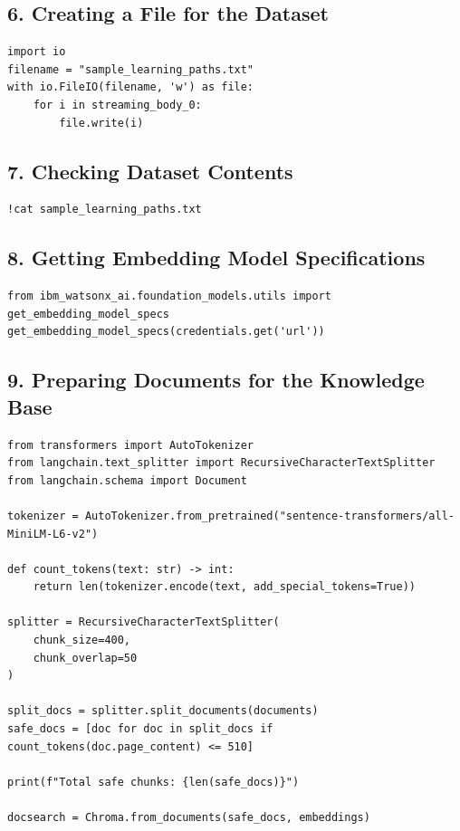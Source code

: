 \documentclass[12pt]{article}
\begin{document}
\subsection*{6. Creating a File for the Dataset}
\begin{lstlisting}
import io
filename = "sample_learning_paths.txt"
with io.FileIO(filename, 'w') as file: 
    for i in streaming_body_0:
        file.write(i)
\end{lstlisting}

\subsection*{7. Checking Dataset Contents}
\begin{lstlisting}
!cat sample_learning_paths.txt
\end{lstlisting}

\subsection*{8. Getting Embedding Model Specifications}
\begin{lstlisting}
from ibm_watsonx_ai.foundation_models.utils import get_embedding_model_specs 
get_embedding_model_specs(credentials.get('url'))
\end{lstlisting}

\subsection*{9. Preparing Documents for the Knowledge Base}
\begin{lstlisting}
from transformers import AutoTokenizer
from langchain.text_splitter import RecursiveCharacterTextSplitter
from langchain.schema import Document

tokenizer = AutoTokenizer.from_pretrained("sentence-transformers/all-MiniLM-L6-v2")

def count_tokens(text: str) -> int:
    return len(tokenizer.encode(text, add_special_tokens=True))

splitter = RecursiveCharacterTextSplitter(
    chunk_size=400,
    chunk_overlap=50
)

split_docs = splitter.split_documents(documents)
safe_docs = [doc for doc in split_docs if count_tokens(doc.page_content) <= 510]

print(f"Total safe chunks: {len(safe_docs)}")

docsearch = Chroma.from_documents(safe_docs, embeddings)
\end{lstlisting}
\end{document}
